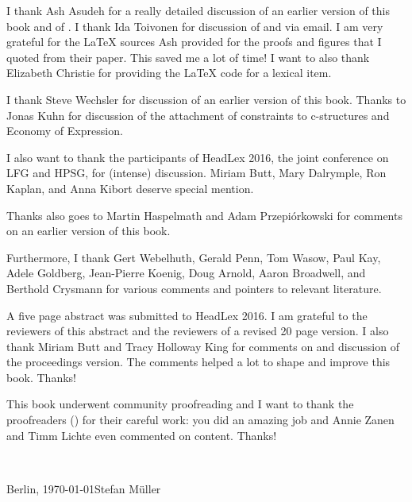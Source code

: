 I thank Ash Asudeh for a really detailed discussion of an earlier version of this book and of
. I thank Ida Toivonen for discussion of  and 
via email. I am very grateful for the \LaTeX{} sources Ash provided for the proofs and figures
that I quoted from their paper. This saved me a lot of time! I want to also thank Elizabeth Christie
for providing the \LaTeX{} code for a lexical item.

I thank Steve Wechsler for discussion of an earlier version of this book. Thanks to Jonas Kuhn for
discussion of the attachment of constraints to c-structures and Economy of Expression.

I also want to thank the participants of HeadLex 2016, the joint conference on LFG and HPSG, for (intense) discussion. Miriam Butt, Mary Dalrymple,
 Ron Kaplan, and Anna Kibort deserve special mention.

Thanks also goes to Martin Haspelmath and Adam Przepiórkowski for comments on an earlier version of this book.

Furthermore, I thank Gert Webelhuth, Gerald Penn, Tom Wasow, Paul Kay, %
Adele Goldberg, Jean-Pierre Koenig, Doug Arnold, Aaron Broadwell, and Berthold Crysmann for various
comments and pointers to relevant literature.

A five page abstract was submitted to HeadLex 2016. I am
grateful to the reviewers of this abstract and the reviewers of a revised 20 page version. I also
thank Miriam Butt and Tracy Holloway King for comments on and discussion of the proceedings version.  The
comments helped a lot to shape and improve this book. Thanks!  

This book underwent community proofreading and I want to thank the proofreaders
(\makeatletter\@proofreader\makeatother) for their careful work: you did an amazing job and Annie
Zanen and Timm Lichte even commented on content. Thanks!


~\medskip

\noindent
Berlin, \today\hfill Stefan Müller


\mainmatter


